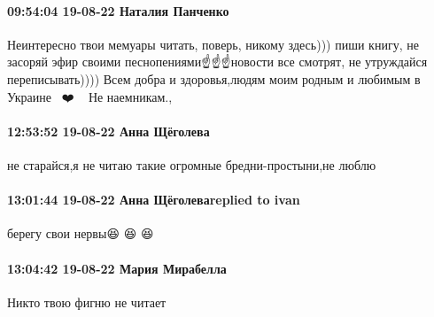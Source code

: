  
 
 
 
 

\paragraph{09:54:04 19-08-22 Наталия Панченко}

Неинтересно твои мемуары читать, поверь, никому здесь))) пиши книгу, не засоряй
эфир своими песнопениями☝️☝️☝️новости все смотрят, не утруждайся переписывать))))
Всем добра и здоровья,людям моим родным и любимым в Украине🥰🥰🥰❤️🤗🤗🤗 Не
наемникам.,

\paragraph{12:53:52 19-08-22 Анна Щёголева}

не старайся,я не читаю такие огромные бредни-простыни,не люблю

\paragraph{13:01:44 19-08-22 Анна Щёголеваreplied to ivan}

берегу свои нервы😆 😆 😆

\paragraph{13:04:42 19-08-22 Мария Мирабелла}

Никто твою фигню не читает🤣🤣🤣
